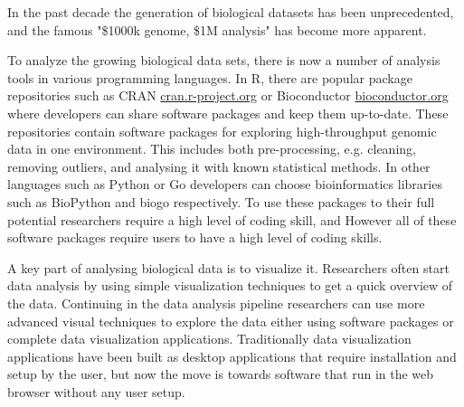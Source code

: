 
In the past decade the generation of biological datasets has been unprecedented,
and the famous "\$1000k genome, \$1M analysis"\cite{} has become more apparent.


To analyze the growing biological data sets, there is now a number of analysis
tools in various programming languages.\cite{} In R, there are popular package
repositories such as CRAN \url{cran.r-project.org} or Bioconductor
\url{bioconductor.org} where developers can share software packages and keep
them up-to-date.  These repositories contain software packages for exploring
high-throughput genomic data in one environment. This includes both
pre-processing, e.g. cleaning, removing outliers, and analysing it with known
statistical methods. In other languages such as Python or Go developers can
choose bioinformatics libraries such as BioPython\cite{} and biogo\cite{}
respectively.  To use these packages to their full potential researchers require
a high level of coding skill, and 
However all of these software packages require users to have a
high level of coding skills. 

A key part of analysing biological data is to visualize it. Researchers often
start data analysis by using simple visualization techniques to get a quick
overview of the data. Continuing in the data analysis pipeline researchers can
use more advanced visual techniques to explore the data either using
software packages or complete data visualization applications. Traditionally
data visualization applications have been built as desktop applications that
require installation and setup by the user, but now the move is towards software
that run in the web browser without any user setup. 

